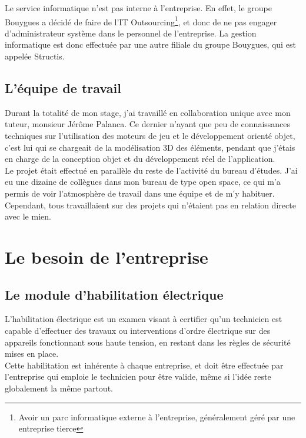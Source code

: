 \documentclass[a4paper]{article}
\begin{document}
    \vfill
    Le service informatique n'est pas interne à l'entreprise. En effet, le groupe Bouygues a décidé de faire de l'IT Outsourcing\footnote{Avoir un parc informatique externe à l'entreprise, généralement géré par une entreprise tierce}, et donc de ne pas engager d'administrateur système dans le personnel de l'entreprise. La gestion informatique est donc effectuée par une autre filiale du groupe Bouygues, qui est appelée Structis. \\
    \vfill  

    \newpage

    \subsection{L'équipe de travail}

    Durant la totalité de mon stage, j'ai travaillé en collaboration unique avec mon tuteur, monsieur Jérôme Palanca. Ce dernier n'ayant que peu de connaissances techniques sur l'utilisation des moteurs de jeu et le développement orienté objet, c'est lui qui se chargeait de la modélisation 3D des éléments, pendant que j'étais en charge de la conception objet et du développement réel de l'application. \\
    
    Le projet était effectué en parallèle du reste de l'activité du bureau d'études. J'ai eu une dizaine de collègues dans mon bureau de type open space, ce qui m'a permis de voir l'atmosphère de travail dans une équipe et de m'y habituer. Cependant, tous travaillaient sur des projets qui n'étaient pas en relation directe avec le mien. \\
    
    \section{Le besoin de l'entreprise}
    \subsection{Le module d'habilitation électrique}

        L'habilitation électrique est un examen visant à certifier qu'un technicien est capable d'effectuer des travaux ou interventions d'ordre électrique sur des appareils fonctionnant sous haute tension, en restant dans les règles de sécurité mises en place. \\

        Cette habilitation est inhérente à chaque entreprise, et doit être effectuée par l'entreprise qui emploie le technicien pour être valide, même si l'idée reste globalement la même partout. \\
\end{document}
